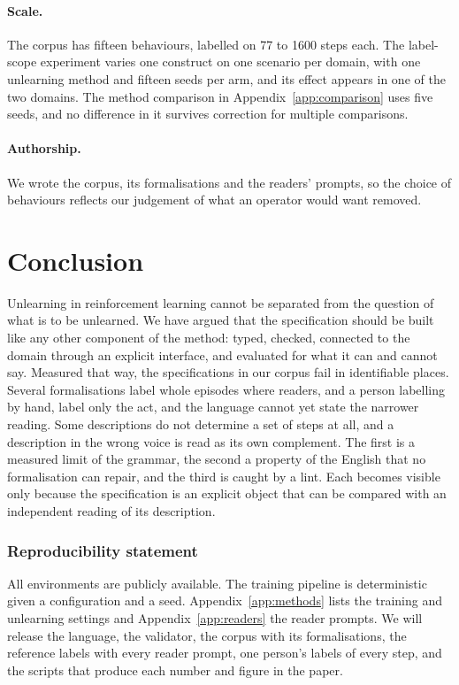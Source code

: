 \documentclass{article}
\begin{document}
\paragraph{Scale.} The corpus has fifteen behaviours, labelled on
77 to 1600 steps each. The label-scope experiment varies one construct on one
scenario per domain, with one unlearning method and fifteen seeds per arm,
and its effect appears in one of the two domains. The method comparison
in Appendix~\ref{app:comparison} uses five seeds, and no difference in it
survives correction for multiple comparisons.

\paragraph{Authorship.} We wrote the corpus, its formalisations and the
readers' prompts, so the choice of behaviours reflects our judgement of
what an operator would want removed.

\section{Conclusion}

Unlearning in reinforcement learning cannot be separated from the
question of what is to be unlearned. We have argued that the
specification should be built like any other component of the method:
typed, checked, connected to the domain through an explicit interface,
and evaluated for what it can and cannot say. Measured that way, the
specifications in our corpus fail in identifiable places. Several
formalisations label whole episodes where readers, and a person labelling
by hand, label only the act, and the language cannot yet state the
narrower reading. Some
descriptions do not determine a set of steps at all, and a description in
the wrong voice is read as its own complement. The first is a measured
limit of the grammar, the second a property of the English that no
formalisation can repair, and the third is caught by a lint. Each becomes
visible only because the specification is an explicit object that can be
compared with an independent reading of its description.

\subsubsection*{Reproducibility statement}

All environments are publicly available. The training pipeline is
deterministic given a configuration and a seed.
Appendix~\ref{app:methods} lists the training and unlearning settings and
Appendix~\ref{app:readers} the reader prompts. We will release the
language, the validator, the corpus with its formalisations, the reference
labels with every reader prompt, one person's labels of every step, and
the scripts that produce each number
and figure in the paper.
\end{document}
